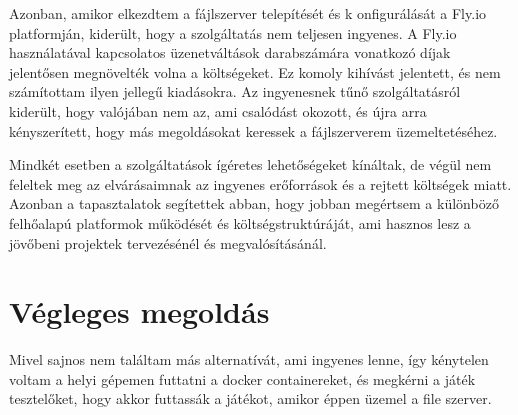 Azonban, amikor elkezdtem a fájlszerver telepítését és k
onfigurálását a Fly.io platformján, kiderült, hogy a szolgáltatás nem teljesen ingyenes.
A Fly.io használatával kapcsolatos üzenetváltások darabszámára vonatkozó díjak jelentősen 
megnövelték volna a költségeket. Ez komoly kihívást jelentett, és nem számítottam ilyen jellegű kiadásokra. 
Az ingyenesnek tűnő szolgáltatásról kiderült, 
hogy valójában nem az, ami csalódást okozott, 
és újra arra kényszerített, hogy más megoldásokat keressek a fájlszerverem üzemeltetéséhez.

Mindkét esetben a szolgáltatások ígéretes lehetőségeket kínáltak, de végül nem feleltek meg az elvárásaimnak az ingyenes erőforrások és a rejtett költségek miatt. Azonban a tapasztalatok segítettek abban, hogy jobban megértsem a különböző felhőalapú platformok működését és költségstruktúráját, ami hasznos lesz a jövőbeni projektek tervezésénél és megvalósításánál.
\section{Végleges megoldás}
Mivel sajnos nem találtam más alternatívát, ami ingyenes lenne, így kénytelen voltam a helyi gépemen futtatni a docker containereket, és megkérni a játék tesztelőket, hogy akkor futtassák a játékot, amikor éppen üzemel a file szerver. 